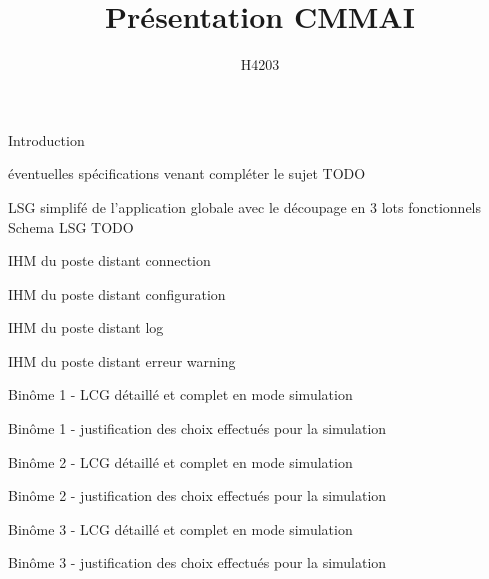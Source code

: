 \documentclass{beamer}
\title{Présentation CMMAI}
\author{H4203} %
\begin{document}
\begin{frame}
\titlepage
\end{frame}

\begin{frame}
Introduction
\end{frame}

\begin{frame}
éventuelles spécifications venant compléter le sujet
TODO
\end{frame}

\begin{frame}
LSG simplifé de l'application globale avec le découpage en 3 lots fonctionnels
Schema LSG TODO
\end{frame}

\begin{frame}
IHM du poste distant
connection
\end{frame}

\begin{frame}
IHM du poste distant
configuration
\end{frame}

\begin{frame}
IHM du poste distant
log
\end{frame}

\begin{frame}
IHM du poste distant
erreur \/ warning
\end{frame}

\begin{frame}
Binôme 1
- LCG détaillé et complet en mode simulation

\end{frame}

\begin{frame}
Binôme 1
- justification des choix effectués pour la simulation 
\end{frame}

\begin{frame}
Binôme 2
- LCG détaillé et complet en mode simulation
\end{frame}

\begin{frame}
Binôme 2
- justification des choix effectués pour la simulation  
\end{frame}

\begin{frame}
Binôme 3
- LCG détaillé et complet en mode simulation
\end{frame}

\begin{frame}
Binôme 3
- justification des choix effectués pour la simulation 
\end{frame}
\end{document}
